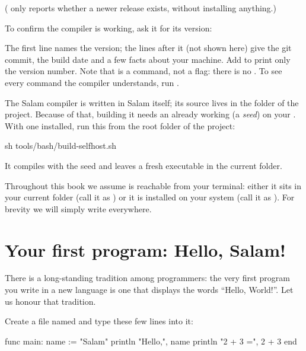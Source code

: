 \noindent ( only reports whether a newer release
exists, without installing anything.)

\begin{tip}
To confirm the compiler is working, ask it for its version:
The first line names the version; the lines after it (not shown here) give the
git commit, the build date and a few facts about your machine. Add
 to print only the version number. Note that  is a
command, not a flag: there is no . To see every command
the compiler understands, run .
\end{tip}

\begin{deep}
The Salam compiler is written in Salam itself; its source lives in the
 folder of the project. Because of that, building it needs an
already working  (a \emph{seed}) on your . With one
installed, run this from the root folder of the project:
\begin{shell}
sh tools/bash/build-selfhost.sh
\end{shell}
It compiles  with the seed and leaves a fresh
 executable in the current folder.
\end{deep}

\begin{note}
Throughout this book we assume  is reachable from your terminal:
either it sits in your current folder (call it as ) or it is
installed on your system  (call it as ). For brevity we
will simply write  everywhere.
\end{note}

\section{Your first program: Hello, Salam!}

There is a long-standing tradition among programmers: the very first program you
write in a new language is one that displays the words ``Hello, World!''. Let us
honour that tradition.

Create a file named  and type these few lines into it:

\begin{salamen}
func main:
    name := "Salam"
    println "Hello,", name
    println "2 + 3 =", 2 + 3
end
\end{salamen}

